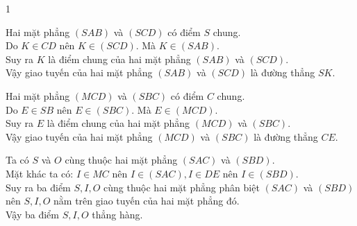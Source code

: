 \begin{bt}
{\begin{enumEX}{1}
{
			}
			\item Hai mặt phẳng $(S A B)$ và $(S C D)$ có điểm $S$ chung.\\
			Do $K \in CD$ nên $K \in(S C D)$. Mà $K \in(S A B)$.\\
			Suy ra $K$ là điểm chung của hai mặt phẳng $(S A B)$ và $(S C D)$.\\
			Vậy giao tuyến của hai mặt phẳng $(S A B)$ và $(S C D)$ là đường thẳng $S K$.
			\item Hai mặt phẳng $(M C D)$ và $(S B C)$ có điểm $C$ chung.\\
			Do $E \in S B$ nên $E \in(S B C)$. Mà $E \in(M C D)$.\\
			Suy ra $E$ là điểm chung của hai mặt phẳng $(M C D)$ và $(S B C)$.\\
			Vậy giao tuyến của hai mặt phẳng $(M C D)$ và $(S B C)$ là đường thẳng $C E$.
			\item Ta có $S$ và $O$ cùng thuộc hai mặt phẳng $(S A C)$ và $(S B D)$.\\
			Mặt khác ta có: $I \in M C$ nên $I \in(S A C), I \in DE$ nên $I \in(S B D)$.\\
			Suy ra ba điểm $S, I, O$ cùng thuộc hai mặt phẳng phân biệt $(S A C)$ và $(S B D)$ nên $S, I, O$ nằm trên giao tuyến của hai mặt phẳng đó.\\
			Vậy ba điểm $S, I, O$ thẳng hàng.
		\end{enumEX}	
	}
\end{bt}
